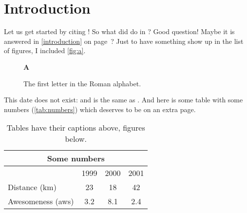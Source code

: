 \chapter{Introduction}\label{introduction}
Let us get started by citing \citet{manning:1999}!
So what did \citeauthor{manning:1999} do in \citeyear{manning:1999}?
Good question!
Maybe it is answered in \autoref{introduction} on page~\pageref{introduction}?
Just to have something show up in the list of figures, I included \autoref{fig:a}.
\begin{figure}[bt]%
  \begin{center}{\huge\bf A}\end{center}
  \caption{The first letter in the Roman alphabet.}\label{fig:a}
\end{figure}
This date does not exist: 
and is the same as .
And here is some table with some numbers (\autoref{tab:numbers})
which deserves to be on an extra page.
\begin{table}[p]%
\caption{Tables have their captions above, figures below.}
\label{tab:numbers}%
\centering\small
\begin{tabular}{@{}lccc@{}} %
\toprule
\multicolumn{4}{c}{\bf Some numbers}\\
\midrule
& 1999 & 2000 & 2001 \\
\cmidrule(l){2-4} %
Distance (km) & 23 & 18 & 42 \\
Awesomeness (aws) & 3.2 & 8.1 & 2.4 \\
\bottomrule
\end{tabular}
\end{table}

